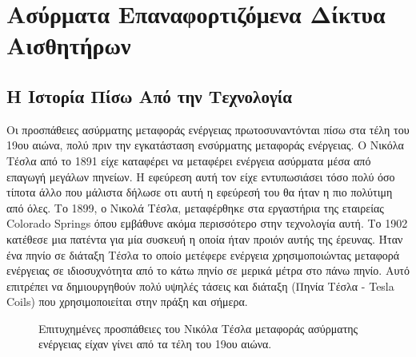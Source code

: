 

\chapter{Ασύρματα Επαναφορτιζόμενα Δίκτυα Αισθητήρων}\label{ch:wrsns}
\section{Η Ιστορία Πίσω Από την Τεχνολογία}
Οι προσπάθειες ασύρματης μεταφοράς ενέργειας πρωτοσυναντόνται πίσω στα τέλη του 19ου αιώνα, πολύ πριν την εγκατάσταση ενσύρματης μεταφοράς ενέργειας. Ο Νικόλα Τέσλα
από το 1891 είχε καταφέρει να μεταφέρει ενέργεια ασύρματα μέσα από επαγωγή μεγάλων πηνείων. Η εφεύρεση αυτή τον είχε εντυπωσιάσει τόσο πολύ όσο τίποτα άλλο που
μάλιστα δήλωσε οτι αυτή η εφεύρεσή του θα ήταν η πιο πολύτιμη από όλες. Tο 1899, ο Νικολά Τέσλα, μεταφέρθηκε στα εργαστήρια της εταιρείας Colorado Springs όπου
εμβάθυνε ακόμα περισσότερο στην τεχνολογία αυτή. Το 1902 κατέθεσε μια πατέντα \cite{tesla_patent} για μία συσκευή η οποία ήταν προιόν αυτής της έρευνας. Ήταν ένα
πηνίο σε διάταξη Τέσλα το οποίο μετέφερε ενέργεια χρησιμοποιώντας μεταφορά ενέργειας σε ιδιοσυχνότητα από το κάτω πηνίο σε μερικά μέτρα στο πάνω πηνίο. Αυτό
επιτρέπει να δημιουργηθούν πολύ υψηλές τάσεις και διάταξη (Πηνία Τέσλα - Tesla Coils) που χρησιμοποιείται στην πράξη και σήμερα.

\begin{figure}[h]
  \centering
  \caption{Επιτυχημένες προσπάθειες του Νικόλα Τέσλα μεταφοράς ασύρματης ενέργειας είχαν γίνει από τα τέλη του 19ου αιώνα.}
  \label{fig:tesla_eperiments}
\end{figure}

